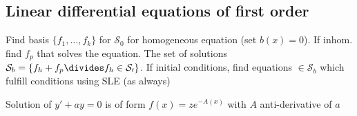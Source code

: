 \newsectionNoPB
\subsection{Linear differential equations of first order}
  Find basis $\{ f_1, \ldots, f_k \}$ for $\mathcal{S}_0$ for homogeneous equation (set $b(x) = 0$).
 If inhom. find $f_p$ that solves the equation. The set of solutions $\mathcal{S}_b = \{ f_h + f_p \divides f_h \in \mathcal{S_0} \}$.
 If initial conditions, find equations $\in \mathcal{S}_b$ which fulfill conditions using SLE (as always)

\shortproposition Solution of $y' + ay = 0$ is of form $f(x) = z e^{-A(x)}$ with $A$ anti-derivative of $a$
